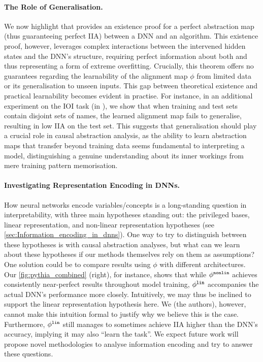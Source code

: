 \documentclass{article}
\newcommand{\causalmap}{\phi}
\begin{document}
\paragraph{The Role of Generalisation.}
We now highlight that  provides an existence proof for a perfect abstraction map (thus guaranteeing perfect IIA) between a DNN and an algorithm.
This existence proof, however, leverages complex interactions between the intervened hidden states and the DNN's structure, requiring perfect information about both and thus representing a form of extreme overfitting.
Crucially, 
this theorem offers no guarantees regarding the learnability of the alignment map $\causalmap$ from limited data or its generalisation to unseen inputs.
This gap between theoretical existence and practical learnability becomes evident in practise.
For instance, in an additional experiment on the IOI task (in ), we show that when training and test sets contain disjoint sets of names, the learned alignment map fails to generalise, resulting in low IIA on the test set.
This suggests that generalisation should play a crucial role in causal abstraction analysis, as the ability to learn abstraction maps that transfer beyond training data seems fundamental to interpreting a model, distinguishing a genuine understanding about its inner workings from mere training pattern memorisation.

\vspace{-1pt}
\paragraph{Investigating Representation Encoding in DNNs.} 
How neural networks encode variables/concepts is a long-standing question in interpretability, with three main hypotheses standing out: the privileged bases, linear representation, and non-linear representation hypotheses (see \cref{sec:Information_encoding_in_dnns}).
One way to try to distinguish between these hypotheses is with causal abstraction analyses, but what can we learn about these hypotheses if our methods themselves rely on them as assumptions?
One solution could be to compare results using $\causalmap$ with different architectures.
Our \cref{fig:pythia_combined} (right), for instance, shows that while $\RevNet$ achieves consistently near-perfect results throughout model training, $\Rotation$ accompanies the actual DNN's performance more closely.
Intuitively, we may thus be inclined to support the linear representation hypothesis here.
We (the authors), however, cannot make this intuition formal to justify why we believe this is the case.
Furthermore, $\Rotation$ still manages to sometimes achieve IIA higher than the DNN's accuracy, implying it may also ``learn the task''.
We expect future work will propose novel methodologies to analyse information encoding and try to answer these questions.
\end{document}

